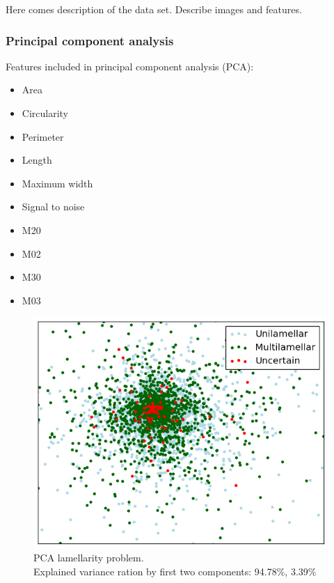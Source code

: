 \documentclass[a4paper, 11pt, table]{article}
\begin{document}
Here comes description of the data set. Describe images and features.

\subsubsection{Principal component analysis}

Features included in principal component analysis (PCA):
\begin{itemize}
\item Area
\item Circularity
\item Perimeter
\item Length
\item Maximum width
\item Signal to noise
\item M20
\item M02
\item M30
\item M03
\end{itemize}

\begin{figure}[H]
\centering
\includegraphics[scale=0.7]{pca/lamellarity.png}
\caption{PCA lamellarity problem. \\ Explained variance ration by first two components: 94.78\%, 3.39\%}
\end{figure}
\end{document}
